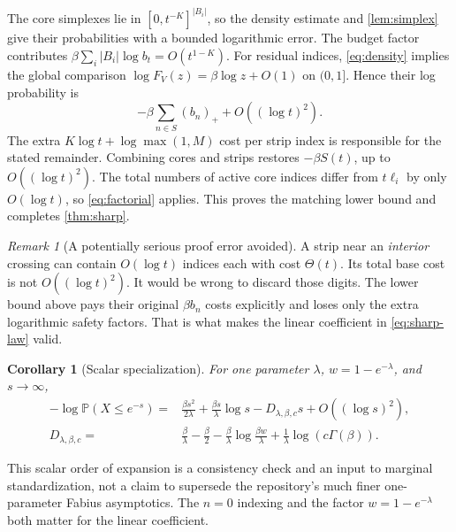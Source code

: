 \documentclass[11pt,a4paper]{article}
\newtheorem{corollary}[theorem]{Corollary}
\theoremstyle{definition}
\theoremstyle{remark}
\newtheorem{remark}[theorem]{Remark}
\newcommand{\PP}{\mathbb P}
\newcommand{\pos}[1]{\left(#1\right)_+}
\numberwithin{equation}{section}
\begin{document}
The core simplexes lie in $[0,t^{-K}]^{|B_i|}$, so the density estimate and
\cref{lem:simplex} give their probabilities with a bounded logarithmic
error. The budget factor contributes
$\beta\sum_i|B_i|\log b_t=O(t^{1-K})$. For residual indices,
\eqref{eq:density} implies the global comparison
$\log F_V(z)=\beta\log z+O(1)$ on $(0,1]$. Hence their log probability is
\[
 -\beta\sum_{n\in S}\pos{b_n}+O((\log t)^2).
\]
The extra $K\log t+\log\max(1,M)$ cost per strip index is responsible
for the stated remainder. Combining cores and strips restores
$-\beta S(t)$, up to $O((\log t)^2)$. The total numbers of active core
indices differ from $t\ell_i$ by only $O(\log t)$, so
\eqref{eq:factorial} applies. This proves the matching lower bound and
completes \cref{thm:sharp}.

\begin{remark}[A potentially serious proof error avoided]
A strip near an \emph{interior} crossing can contain $O(\log t)$ indices
each with cost $\Theta(t)$. Its total base cost is not
$O((\log t)^2)$. It would be wrong to discard those digits. The lower
bound above pays their original $\beta b_n$ costs explicitly and loses
only the extra logarithmic safety factors. That is what makes the linear
coefficient in \eqref{eq:sharp-law} valid.
\end{remark}

\begin{corollary}[Scalar specialization]
\label{cor:scalar}
For one parameter $\lambda$, $w=1-e^{-\lambda}$, and $s\to\infty$,
\begin{equation}
 \begin{split}
 -\log\PP(X\le e^{-s})
 ={}&\frac{\beta s^2}{2\lambda}
     +\frac{\beta s}{\lambda}\log s-D_{\lambda,\beta,c}s
     +O((\log s)^2),\\
 D_{\lambda,\beta,c}
 ={}&\frac{\beta}{\lambda}-\frac{\beta}{2}
 -\frac{\beta}{\lambda}\log\frac{\beta w}{\lambda}
 +\frac1\lambda\log(c\Gamma(\beta)).
 \end{split}
 \label{eq:scalar}
\end{equation}
\end{corollary}
This scalar order of expansion is a consistency check and an input to
marginal standardization, not a claim to supersede the repository's much
finer one-parameter Fabius asymptotics. The $n=0$ indexing and the factor
$w=1-e^{-\lambda}$ both matter for the linear coefficient.
\end{document}
